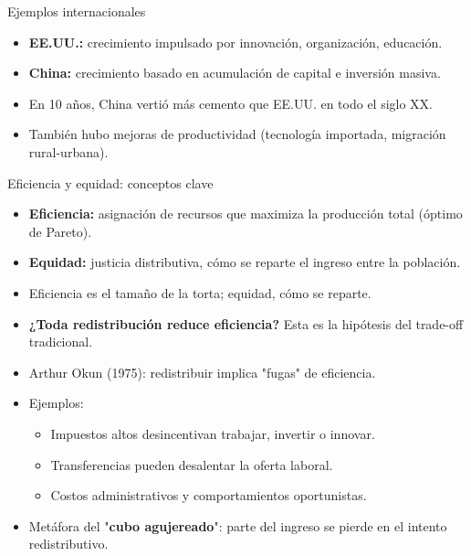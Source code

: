 \documentclass{beamer}
\begin{document}
\begin{frame}{Ejemplos internacionales}
    \begin{itemize}
        \item \textbf{EE.UU.:} crecimiento impulsado por innovación, organización, educación.
        \item \textbf{China:} crecimiento basado en acumulación de capital e inversión masiva.
        \item En 10 años, China vertió más cemento que EE.UU. en todo el siglo XX.
        \item También hubo mejoras de productividad (tecnología importada, migración rural-urbana).
    \end{itemize}
\end{frame}

\begin{frame}{Eficiencia y equidad: conceptos clave}
    \begin{itemize}
        \item \textbf{Eficiencia:} asignación de recursos que maximiza la producción total (óptimo de Pareto).
        \item \textbf{Equidad:} justicia distributiva, cómo se reparte el ingreso entre la población.
        \item Eficiencia es el tamaño de la torta; equidad, cómo se reparte.
        \item \textbf{¿Toda redistribución reduce eficiencia?} Esta es la hipótesis del trade-off tradicional. \pause
        \item Arthur Okun (1975): redistribuir implica "fugas" de eficiencia.
        \item Ejemplos:
        \begin{itemize}
            \item Impuestos altos desincentivan trabajar, invertir o innovar.
            \item Transferencias pueden desalentar la oferta laboral.
            \item Costos administrativos y comportamientos oportunistas.
        \end{itemize}
        \item Metáfora del "\textbf{cubo agujereado}": parte del ingreso se pierde en el intento redistributivo.
    \end{itemize}
\end{frame}
\end{document}

